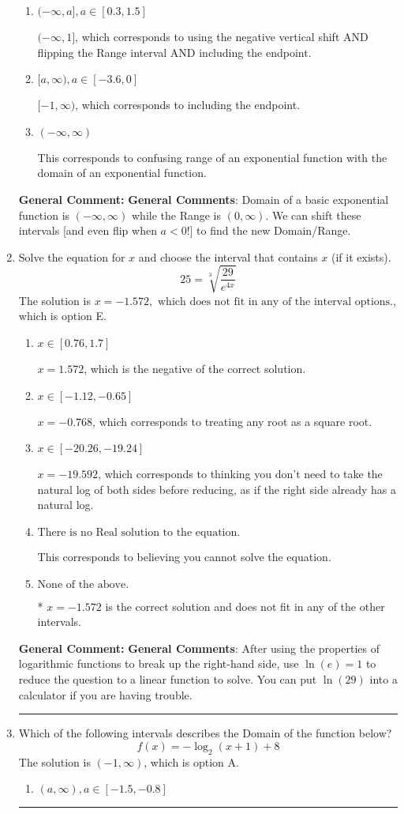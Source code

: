 \documentclass{extbook}[14pt]
\newcommand{\litem}[1]{\item #1

\rule{\textwidth}{0.4pt}}
\begin{document}
\begin{enumerate}
{\begin{enumerate}[label=\Alph*.]
$(-\infty, 1)$, which corresponds to using the negative vertical shift AND flipping the Range interval.
\item \( (-\infty, a], a \in [0.3, 1.5] \)

$(-\infty, 1]$, which corresponds to using the negative vertical shift AND flipping the Range interval AND including the endpoint.
\item \( [a, \infty), a \in [-3.6, 0] \)

$[-1, \infty)$, which corresponds to including the endpoint.
\item \( (-\infty, \infty) \)

This corresponds to confusing range of an exponential function with the domain of an exponential function.
\end{enumerate}

\textbf{General Comment:} \textbf{General Comments}: Domain of a basic exponential function is $(-\infty, \infty)$ while the Range is $(0, \infty)$. We can shift these intervals [and even flip when $a<0$!] to find the new Domain/Range.
}
\litem{
 Solve the equation for $x$ and choose the interval that contains $x$ (if it exists).
\[  25 = \sqrt[3]{\frac{29}{e^{4x}}} \]The solution is \( x = -1.572, \text{ which does not fit in any of the interval options.} \), which is option E.\begin{enumerate}[label=\Alph*.]
\item \( x \in [0.76, 1.7] \)

$x = 1.572$, which is the negative of the correct solution.
\item \( x \in [-1.12, -0.65] \)

$x = -0.768$, which corresponds to treating any root as a square root.
\item \( x \in [-20.26, -19.24] \)

$x = -19.592$, which corresponds to thinking you don't need to take the natural log of both sides before reducing, as if the right side already has a natural log.
\item \( \text{There is no Real solution to the equation.} \)

This corresponds to believing you cannot solve the equation.
\item \( \text{None of the above.} \)

* $x = -1.572$ is the correct solution and does not fit in any of the other intervals.
\end{enumerate}

\textbf{General Comment:} \textbf{General Comments}: After using the properties of logarithmic functions to break up the right-hand side, use $\ln(e) = 1$ to reduce the question to a linear function to solve. You can put $\ln(29)$ into a calculator if you are having trouble.
}
\litem{
Which of the following intervals describes the Domain of the function below?
\[ f(x) = -\log_2{(x+1)}+8 \]The solution is \( (-1, \infty) \), which is option A.\begin{enumerate}[label=\Alph*.]
\item \( (a, \infty), a \in [-1.5, -0.8] \)


\end{enumerate}}
\end{enumerate}
\end{document}
